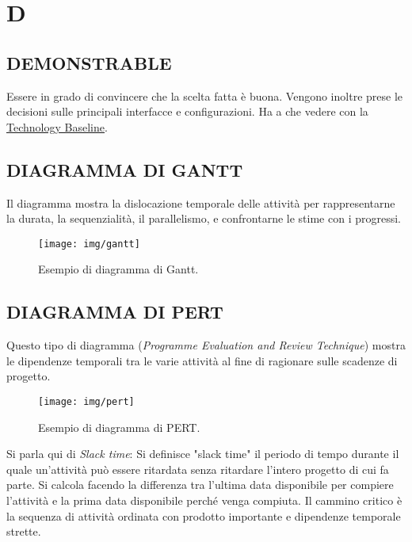 \newpage
	\section{D} \label{sec:D}
	
		\subsection{DEMONSTRABLE}		\label{demonstrable}
		Essere in grado di convincere che la scelta fatta è buona. Vengono inoltre prese le decisioni sulle principali interfacce e configurazioni. Ha  a che vedere con la \underline{\hyperref[technologybaseline]{Technology Baseline}}.
	
		\subsection{DIAGRAMMA DI GANTT}  \label{gantt}
		Il diagramma mostra la dislocazione temporale delle attività per rappresentarne la durata, la sequenzialità, il parallelismo, e confrontarne le stime con i progressi.
		
		\begin{figure}[H]
			\centering
			\texttt{[image: img/gantt]}		
			\caption{Esempio di diagramma di Gantt.}
		\end{figure} 
	
		\subsection{DIAGRAMMA DI PERT}  \label{pert}
		Questo tipo di diagramma (\textit{Programme Evaluation and Review Technique}) mostra le dipendenze temporali tra le varie attività al fine di ragionare sulle scadenze di progetto.
		
		\begin{figure}[H]
			\centering
			\texttt{[image: img/pert]}		
			\caption{Esempio di diagramma di PERT.}
		\end{figure} 
		
		Si parla qui di \textit{Slack time}: Si definisce "slack time" il periodo di tempo durante il quale un'attività può essere ritardata senza ritardare l'intero progetto di cui fa parte. Si calcola facendo la differenza tra l'ultima data disponibile per compiere l'attività e la prima data disponibile perché venga compiuta. Il cammino critico è la sequenza di attività ordinata con prodotto importante e dipendenze temporale strette.
		
